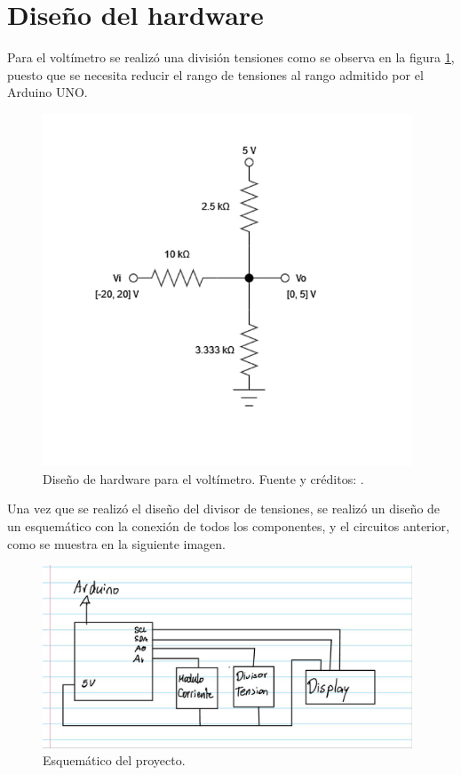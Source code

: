 \section{Diseño del hardware} 
Para el voltímetro se realizó una división tensiones \cite{electronics-stackexchange} como se observa en la figura \ref{hardware}, puesto que se necesita reducir el rango de tensiones al rango admitido por el Arduino UNO.


\begin{figure} [H]
    \centering
    \includegraphics[width=11cm]{Imagenes/Hardware.jpg}
    \caption{Diseño de hardware para el voltímetro. Fuente y créditos: \cite{electronics-stackexchange}.}
    \label{hardware}
\end{figure}

Una vez que se realizó el diseño del divisor de tensiones, se realizó un diseño de un esquemático con la conexión de todos los componentes, y el circuitos anterior, como se muestra en la siguiente imagen.

\begin{figure} [H]
    \centering
    \includegraphics[width=11cm]{Imagenes/Esquematico.jpg}
    \caption{Esquemático del proyecto.}
    \label{Esquematico}
\end{figure}

